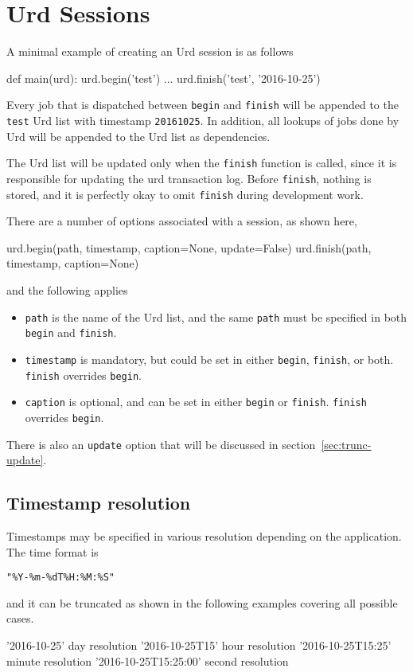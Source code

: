\section{Urd Sessions}

A minimal example of creating an Urd session is as follows
\begin{python}
def main(urd):
    urd.begin('test')
    ...
    urd.finish('test', '2016-10-25')
\end{python}
Every job that is dispatched between \texttt{begin} and
\texttt{finish} will be appended to the \texttt{test} Urd list with
timestamp \texttt{20161025}.  In addition, all lookups of jobs done by
Urd will be appended to the Urd list as dependencies.

The Urd list will be updated only when the \texttt{finish} function is
called, since it is responsible for updating the urd transaction log.
Before \texttt{finish}, nothing is stored, and it is perfectly okay to
omit \texttt{finish} during development work.

There are a number of options associated with a session, as shown
here,
\begin{python}
urd.begin(path, timestamp, caption=None, update=False)
urd.finish(path, timestamp, caption=None)
\end{python}
and the following applies
\begin{itemize}
\item [] \texttt{path} is the name of the Urd list, and the same
  \texttt{path} must be specified in both \texttt{begin} and
  \texttt{finish}.

\item [] \texttt{timestamp} is mandatory, but could be set in either
  \texttt{begin}, \texttt{finish}, or both.  \texttt{finish}
  overrides \texttt{begin}.

\item [] \texttt{caption} is optional, and can be set in either
  \texttt{begin} or \texttt{finish}.  \texttt{finish} overrides
  \texttt{begin}.
\end{itemize}
There is also an \texttt{update} option that will be discussed in
section~\ref{sec:trunc-update}.



\subsection{Timestamp resolution}

Timestamps may be specified in various resolution depending on the
application.  The time format is
\begin{verbatim}
"%Y-%m-%dT%H:%M:%S"
\end{verbatim}
and it can be truncated as shown in the following examples covering all possible cases.
\begin{python}
'2016-10-25'               day resolution
'2016-10-25T15'            hour resolution
'2016-10-25T15:25'         minute resolution
'2016-10-25T15:25:00'      second resolution
\end{python}



